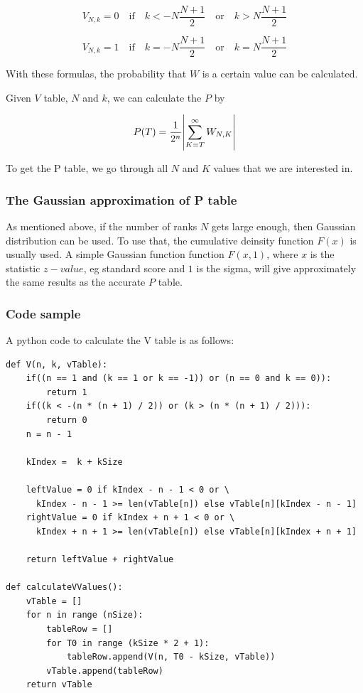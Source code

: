 \documentclass[12pt]{article}
\begin{document}
\begin{equation}
V_{N, k} = 0  \quad\text{if}\quad k < -N  \frac{N+1}{2} \quad\text{or}\quad k > N  \frac{N+1}{2}
\end{equation}

\begin{equation}
V_{N, k} = 1 \quad\text{if}\quad k = -N  \frac{N+1}{2} \quad\text{or}\quad k = N  \frac{N+1}{2}
\end{equation}

With these formulas, the probability that $W$ is a certain value can be calculated.

Given $V$ table, $N$ and $k$, we can calculate the $P$ by

\begin{equation}
P(T) = \frac{1}{2^n} \abs{\sum\limits_{K=T}^{\infty}{W_{N,K}}}
\end{equation}

To get the P table, we go through all $N$ and $K$ values that we are interested in.

\subsubsection{The Gaussian approximation of P table}
As mentioned above, if the number of ranks $N$ gets large enough, then Gaussian distribution can be used. To use that, the cumulative deinsity function $F(x)$ is usually used. A simple Gaussian function function $F(x, 1)$, where $x$ is the statistic $z-value$, eg standard score and $1$ is the sigma, will give approximately the same results as the accurate $P$ table.

\subsubsection{Code sample}
A python code to calculate the V table is as follows:
\begin{verbatim}
def V(n, k, vTable):
    if((n == 1 and (k == 1 or k == -1)) or (n == 0 and k == 0)):
        return 1
    if((k < -(n * (n + 1) / 2)) or (k > (n * (n + 1) / 2))):
        return 0
    n = n - 1

    kIndex =  k + kSize

    leftValue = 0 if kIndex - n - 1 < 0 or \
      kIndex - n - 1 >= len(vTable[n]) else vTable[n][kIndex - n - 1]
    rightValue = 0 if kIndex + n + 1 < 0 or \
      kIndex + n + 1 >= len(vTable[n]) else vTable[n][kIndex + n + 1]

    return leftValue + rightValue

def calculateVValues():
    vTable = []
    for n in range (nSize):
        tableRow = []
        for T0 in range (kSize * 2 + 1):
            tableRow.append(V(n, T0 - kSize, vTable))
        vTable.append(tableRow)
    return vTable

\end{verbatim}
\end{document}
